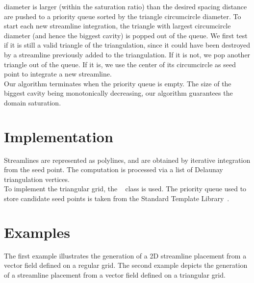  diameter is larger (within the saturation ratio) than the desired
spacing distance are pushed to a priority queue sorted by the triangle
circumcircle diameter. To start each new streamline integration, the triangle
with largest circumcircle diameter (and hence the biggest cavity) is popped out
of the queue. We first test if it is still a valid triangle of the
triangulation, since it could have been destroyed by a streamline previously
added to the triangulation. If it is not, we pop another triangle out of the
queue. If it is, we use the center of its circumcircle as seed point to
integrate a new streamline.\\Our algorithm terminates when the priority queue is empty. The size
of the biggest cavity being monotonically decreasing, our algorithm guarantees
the domain saturation.

\section{Implementation}
\label{Section_2D_Streamlines_Implementation}
Streamlines are represented as polylines, and are obtained by iterative
integration from the seed point. The computation is processed via a list of
Delaunay triangulation vertices.\\To implement the triangular grid, the \cgal\
 class is used. The priority queue used to store
candidate seed
points is taken from the Standard Template Library~\cite{cgal:sgcsi-stlpg-97}.

\section{Examples}
\label{Section_2D_Streamlines_Example}
The first example illustrates the generation of a 2D streamline placement from a 
vector field defined on a regular grid.
The second example depicts the generation of a streamline placement from a vector
field defined on a triangular grid.

